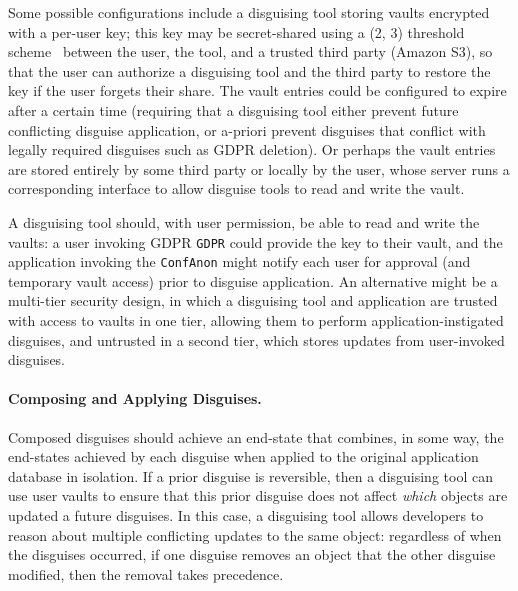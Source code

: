 %
Some possible configurations include a disguising tool storing vaults encrypted with a per-user key; this key
may be secret-shared using a (2, 3) threshold scheme~\cite{secretsharing} between the user, the
tool, and a trusted third party (\eg Amazon S3), so that the user can authorize a disguising tool and the
third party to restore the key if the user forgets their share.
%
The vault entries could be configured to expire after a certain time (requiring that a disguising tool either
prevent future conflicting disguise application, or a-priori prevent disguises that conflict with
legally required disguises such as GDPR deletion).
%
Or perhaps the vault entries are stored entirely by some third party or locally by the user, whose
server runs a corresponding interface to allow disguise tools to read and write the vault.

A disguising tool should, with user permission, be able to read and write the vaults: a user invoking GDPR
\texttt{GDPR} could provide the key to their vault, and the application invoking the
\texttt{ConfAnon} might notify each user for approval (and temporary vault access) prior to disguise
application. An alternative might be a multi-tier security design, in which a disguising tool and application
are trusted with access to vaults in one tier, allowing them to perform application-instigated
disguises, and untrusted in a second tier, which stores updates from user-invoked disguises.


\paragraph{Composing and Applying Disguises.}
Composed disguises should achieve an end-state that combines, in some way, the end-states achieved by each disguise when applied to the original application database in isolation.
%
If a prior disguise is reversible, then a disguising tool can use user vaults to ensure that this
prior disguise does not affect \emph{which} objects are updated
a future disguises. 
In this case, a disguising tool allows developers to reason about multiple conflicting updates to
the same object: 
regardless of when the disguises occurred, if one disguise removes an object that the other disguise
modified, then the removal takes precedence.
%

